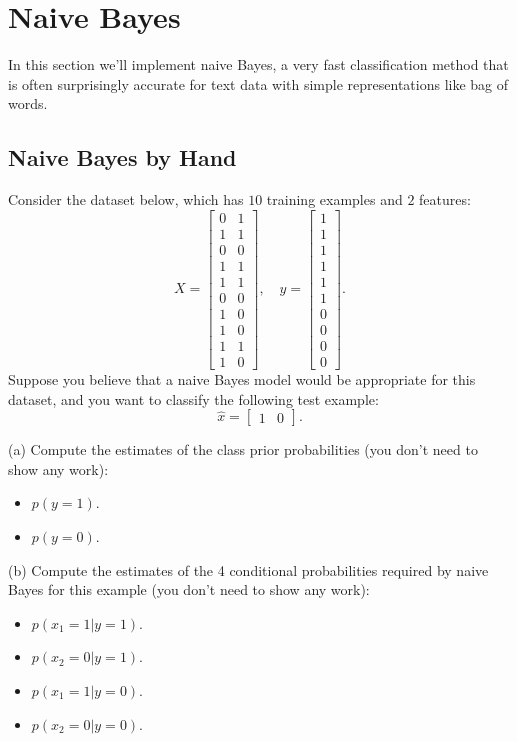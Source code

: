 \documentclass{article}
\def\blu#1{{\color{blu}#1}}
\def\items#1{\begin{itemize}#1\end{itemize}}
\begin{document}
\section{Naive Bayes}

In this section we'll implement naive Bayes, a very fast classification method that is often surprisingly accurate for text data with simple representations like bag of words.



\subsection{Naive Bayes by Hand}

Consider the dataset below, which has $10$ training examples and $2$ features:
\[
X = \begin{bmatrix}0 & 1\\1 & 1\\ 0 & 0\\ 1 & 1\\ 1 & 1\\ 0 & 0\\  1 & 0\\  1 & 0\\  1 & 1\\  1 &0\end{bmatrix}, \quad y = \begin{bmatrix}1\\1\\1\\1\\1\\1\\0\\0\\0\\0\end{bmatrix}.
\]
Suppose you believe that a naive Bayes model would be appropriate for this dataset, and you want to classify the following test example:
\[
\hat{x} = \begin{bmatrix}1 & 0\end{bmatrix}.
\]

\blu{(a) Compute the estimates of the class prior probabilities} (you don't need to show any work):
\items{
\item$ p(y = 1)$.
\item $p(y = 0)$.
}

\blu{(b) Compute the estimates of the 4 conditional probabilities required by naive Bayes for this example}  (you don't need to show any work):
\items{
\item $p(x_1 = 1 | y = 1)$.
\item $p(x_2 = 0 | y = 1)$.
\item $p(x_1 = 1 | y = 0)$.
\item $p(x_2 = 0 | y = 0)$.
}
\end{document}
